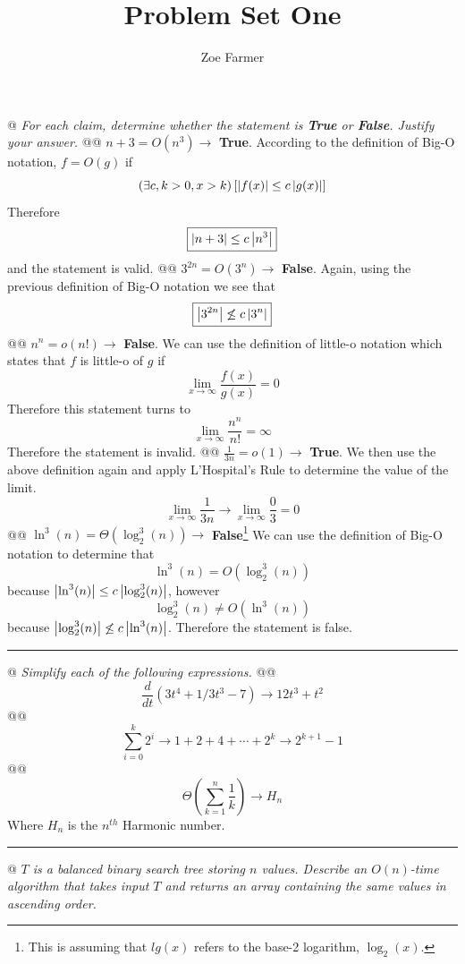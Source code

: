 \documentclass[10pt]{article}
\title{Problem Set One}
\author{Zoe Farmer}
\begin{document}
\maketitle

\begin{easylist}[enumerate]
    @ \textit{For each claim, determine whether the statement is \textbf{True} or \textbf{False}. Justify your answer.}
    @@ $ n + 3 = O(n^3) \to $ \textbf{True}. According to the definition of Big-O notation, $f = O(g)$ if
        \[ \left( \exists c, k > 0, x > k \right) \left[ \left\lvert f(x) \right\rvert \le c \left\lvert g(x) \right\rvert \right] \]
        Therefore
        \[ \boxed{\left\lvert n+3 \right\rvert \le c \left\lvert n^3 \right\rvert} \]
        and the statement is valid.
    @@ $ 3^{2n} = O(3^n) \to $ \textbf{False}. Again, using the previous definition of Big-O notation we see that
        \[ \boxed{\left\lvert 3^{2n} \right\rvert \not\le c \left\lvert 3^n \right\rvert} \]
    @@ $ n^n = o(n!) \to $ \textbf{False}. We can use the definition of little-o notation which states that $f$ is little-o of $g$ if
        \[ \lim_{x\to\infty} \frac{f(x)}{g(x)} = 0 \]
        Therefore this statement turns to
        \[ \boxed{\lim_{x\to\infty} \frac{n^n}{n!} = \infty} \]
        Therefore the statement is invalid.
    @@ $ \frac{1}{3n} = o(1) \to $ \textbf{True}. We then use the above definition again and apply L'Hospital's Rule to determine the value of the limit.
        \[ \lim_{x\to\infty} \frac{1}{3n} \to \boxed{\lim_{x\to\infty} \frac{0}{3} = 0} \]
    @@ $ \ln^3(n) = \Theta (\log^3_2(n)) \to $ \textbf{False}\footnote{This is assuming that $lg(x)$ refers to the base-2 logarithm, $\log_2(x)$.} We can use the definition of Big-O notation to determine that
        \[ \boxed{\ln^3(n) = O(\log^3_2(n))} \]
        because $\left\lvert \ln^3(n) \right\rvert \le c \left\lvert \log^3_2(n) \right\rvert$, however
        \[ \boxed{\log^3_2(n) \neq O(\ln^3(n))} \]
        because $\left\lvert \log^3_2(n) \right\rvert \not\le c \left\lvert \ln^3(n) \right\rvert$. Therefore the statement is false.

    \rule{3in}{0.5pt}

    @ \textit{Simplify each of the following expressions.}
    @@ \[ \frac{d}{dt} (3t^4 + 1/3 t^3 - 7 ) \to \boxed{12t^3 + t^2} \]
    @@ \[ \sum^k_{i=0} 2^i \to 1 + 2 + 4 + \cdots + 2^k \to \boxed{2^{k+1} - 1} \]
    @@ \[ \Theta \left( \sum^n_{k=1} \frac{1}{k} \right) \to \boxed{H_n} \] Where $H_n$ is the $n^{th}$ Harmonic number.

    \rule{3in}{0.5pt}

    @ \textit{$T$ is a balanced binary search tree storing $n$ values. Describe an $O(n)$-time algorithm that takes input $T$ and returns an array containing the same values in \textit{ascending} order.}


\end{easylist}
\end{document}
